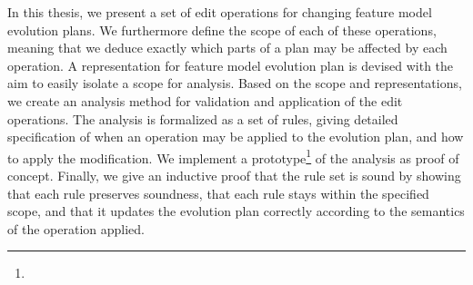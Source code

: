 In this thesis, we present a set of edit operations for changing feature model evolution plans. We furthermore define the scope of each of these operations, meaning that we deduce exactly which parts of a plan may be affected by each operation. A representation for feature model evolution plan is devised with the aim to easily isolate a scope for analysis. Based on the scope and representations, we create an analysis method for validation and application of the edit operations. The analysis is formalized as a set of rules, giving detailed specification of when an operation may be applied to the evolution plan, and how to apply the modification. We implement a prototype\footnote{} of the analysis as proof of concept. Finally, we give an inductive proof that the rule set is sound by showing that each rule preserves soundness, that each rule stays within the specified scope, and that it updates the evolution plan correctly according to the semantics of the operation applied.
